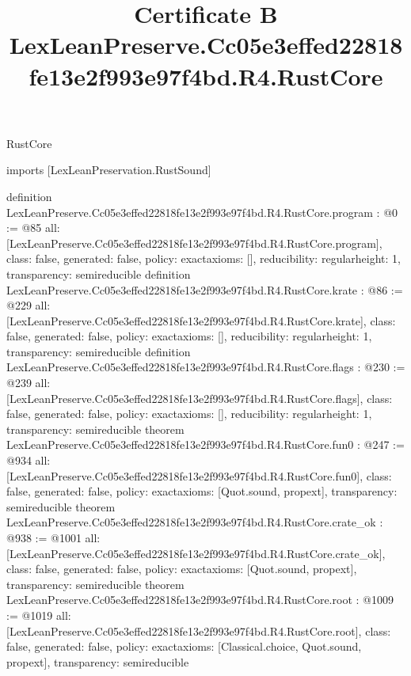 \begin{lexlean}{RustCore}
\title{Certificate B LexLeanPreserve.Cc05e3effed22818fe13e2f993e97f4bd.R4.RustCore}
\begin{coremodule}
imports [LexLeanPreservation.RustSound]

definition LexLeanPreserve.Cc05e3effed22818fe13e2f993e97f4bd.R4.RustCore.program : @0 := @85 {
  all: [LexLeanPreserve.Cc05e3effed22818fe13e2f993e97f4bd.R4.RustCore.program],
  class: false,
  generated: false,
  policy: exact{axioms: []},
  reducibility: regular{height: 1},
  transparency: semireducible
}
definition LexLeanPreserve.Cc05e3effed22818fe13e2f993e97f4bd.R4.RustCore.krate : @86 := @229 {
  all: [LexLeanPreserve.Cc05e3effed22818fe13e2f993e97f4bd.R4.RustCore.krate],
  class: false,
  generated: false,
  policy: exact{axioms: []},
  reducibility: regular{height: 1},
  transparency: semireducible
}
definition LexLeanPreserve.Cc05e3effed22818fe13e2f993e97f4bd.R4.RustCore.flags : @230 := @239 {
  all: [LexLeanPreserve.Cc05e3effed22818fe13e2f993e97f4bd.R4.RustCore.flags],
  class: false,
  generated: false,
  policy: exact{axioms: []},
  reducibility: regular{height: 1},
  transparency: semireducible
}
theorem LexLeanPreserve.Cc05e3effed22818fe13e2f993e97f4bd.R4.RustCore.fun0 : @247 := @934 {
  all: [LexLeanPreserve.Cc05e3effed22818fe13e2f993e97f4bd.R4.RustCore.fun0],
  class: false,
  generated: false,
  policy: exact{axioms: [Quot.sound, propext]},
  transparency: semireducible
}
theorem LexLeanPreserve.Cc05e3effed22818fe13e2f993e97f4bd.R4.RustCore.crate_ok : @938 := @1001 {
  all: [LexLeanPreserve.Cc05e3effed22818fe13e2f993e97f4bd.R4.RustCore.crate_ok],
  class: false,
  generated: false,
  policy: exact{axioms: [Quot.sound, propext]},
  transparency: semireducible
}
theorem LexLeanPreserve.Cc05e3effed22818fe13e2f993e97f4bd.R4.RustCore.root : @1009 := @1019 {
  all: [LexLeanPreserve.Cc05e3effed22818fe13e2f993e97f4bd.R4.RustCore.root],
  class: false,
  generated: false,
  policy: exact{axioms: [Classical.choice, Quot.sound, propext]},
  transparency: semireducible
}


\end{coremodule}
\end{lexlean}
